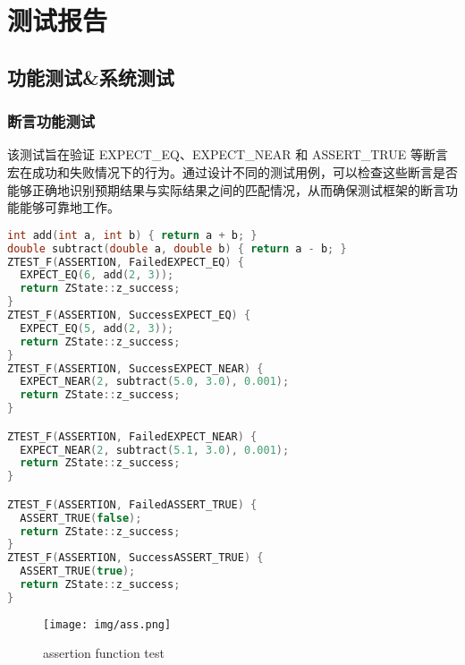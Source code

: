 \documentclass{article}
\begin{document}
\section{测试报告}
\subsection{功能测试\&系统测试}
\subsubsection{断言功能测试}
该测试旨在验证 EXPECT\_EQ、EXPECT\_NEAR 和 ASSERT\_TRUE 等断言宏在成功和失败情况下的行为。通过设计不同的测试用例，可以检查这些断言是否能够正确地识别预期结果与实际结果之间的匹配情况，从而确保测试框架的断言功能能够可靠地工作。
\begin{framed}
    \begin{lstlisting}[language=C++]
int add(int a, int b) { return a + b; }
double subtract(double a, double b) { return a - b; }
ZTEST_F(ASSERTION, FailedEXPECT_EQ) {
  EXPECT_EQ(6, add(2, 3));
  return ZState::z_success;
}
ZTEST_F(ASSERTION, SuccessEXPECT_EQ) {
  EXPECT_EQ(5, add(2, 3));
  return ZState::z_success;
}
ZTEST_F(ASSERTION, SuccessEXPECT_NEAR) {
  EXPECT_NEAR(2, subtract(5.0, 3.0), 0.001);
  return ZState::z_success;
}

ZTEST_F(ASSERTION, FailedEXPECT_NEAR) {
  EXPECT_NEAR(2, subtract(5.1, 3.0), 0.001);
  return ZState::z_success;
}

ZTEST_F(ASSERTION, FailedASSERT_TRUE) {
  ASSERT_TRUE(false);
  return ZState::z_success;
}
ZTEST_F(ASSERTION, SuccessASSERT_TRUE) {
  ASSERT_TRUE(true);
  return ZState::z_success;
}
\end{lstlisting}
\end{framed}
\begin{figure}[H]
    \centering
    \texttt{[image: img/ass.png]} %
    \caption{ assertion function test}
    \label{fig:assertion function test}
\end{figure}
\end{document}
